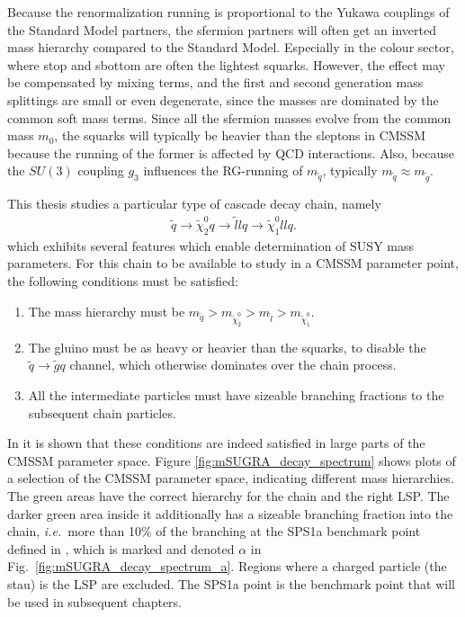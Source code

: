 \documentclass[twoside,english]{uiofysmaster}
\begin{document}
Because the renormalization running is proportional to the Yukawa couplings of the Standard Model partners, the sfermion partners will often get an inverted mass hierarchy compared to the Standard Model. Especially in the colour sector, where stop and sbottom are often the lightest squarks. However, the effect may be compensated by mixing terms, and the first and second generation mass splittings are small or even degenerate, since the masses are dominated by the common soft mass terms. Since all the sfermion masses evolve from the common mass $m_0$, the squarks will typically be heavier than the sleptons in CMSSM because the running of the former is affected by QCD interactions. Also, because the $SU(3)$ coupling $g_3$ influences the RG-running of $m_{\tilde q}$, typically $m_{\tilde q} \approx m_{\tilde g}$.

This thesis studies a particular type of cascade decay chain, namely
\begin{align}
	\tilde q \to \tilde\chi_2^0q \to \tilde l l q \to \tilde \chi_1^0 ll q.	\label{eq:susyintrochap_cascade}
\end{align}
which exhibits several features which enable determination of SUSY mass parameters. For this chain to be available to study in a CMSSM parameter point, the following conditions must be satisfied: 
\begin{enumerate}
	\item The mass hierarchy must be $m_{\tilde q} > m_{\tilde\chi_2^0} > m_{\tilde l} > m_{\tilde\chi_1^0}$.
	\item The gluino must be as heavy or heavier than the squarks, to disable the $\tilde q \to \tilde g q$ channel, which otherwise dominates over the chain process.
	\item All the intermediate particles must have sizeable branching fractions to the subsequent chain particles.
\end{enumerate}
In \cite{Gjelsten:2004ki} it is shown that these conditions are indeed satisfied in large parts of the CMSSM parameter space. Figure \ref{fig:mSUGRA_decay_spectrum} shows plots of a selection of the CMSSM parameter space, indicating different mass hierarchies. The green areas have the correct hierarchy for the chain and the right LSP. The darker green area inside it additionally has a sizeable branching fraction into the chain, {\it i.e.}\ more than 10\% of the branching at the SPS1a benchmark point defined in \cite{Allanach:2002nj}, which is marked and denoted $\alpha$ in Fig.\ \ref{fig:mSUGRA_decay_spectrum_a}. Regions where a charged particle (the stau) is the LSP are excluded. The SPS1a point is the benchmark point that will be used in subsequent chapters.
\end{document}
